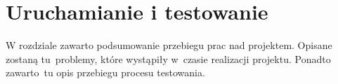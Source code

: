 \section{Uruchamianie i testowanie}
W rozdziale zawarto podsumowanie przebiegu prac nad projektem. Opisane zostaną tu~problemy, które wystąpiły w~czasie realizacji projektu. Ponadto zawarto~tu opis przebiegu procesu testowania.

%
%
%
%
